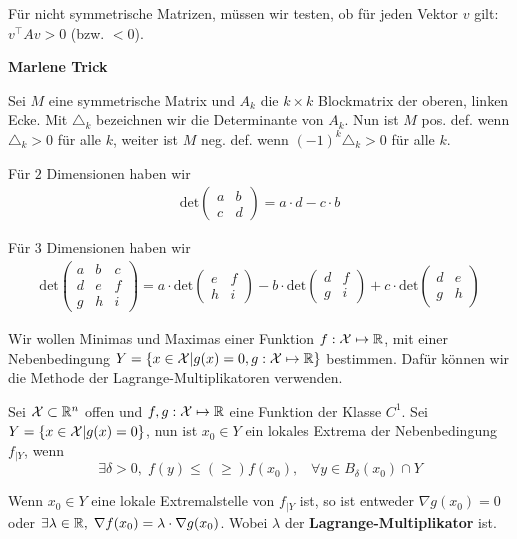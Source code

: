 Für nicht symmetrische Matrizen, müssen wir testen, ob für jeden Vektor $v$ gilt: $v^\top A v > 0$ (bzw. $<0$). \medskip

\textbf{Marlene Trick}

Sei $M$ eine symmetrische Matrix und $A_k$ die $k \times k$ Blockmatrix der oberen, linken
Ecke. Mit $\triangle_k$ bezeichnen wir die Determinante von $A_k$. Nun ist $M$ pos. def.
wenn $\triangle_k > 0$ für alle $k$, weiter ist $M$ neg. def. wenn $(-1)^k \triangle_k > 0$
für alle $k$.

Für $2$ Dimensionen haben wir
\begin{align*}
  \text{det}
  \begin{pmatrix}
    a & b\\
    c & d
  \end{pmatrix}
  = a \cdot d - c \cdot b 
\end{align*}


\vfill\null
\columnbreak


Für $3$ Dimensionen haben wir
\begin{align*}
  \text{det}
  \begin{pmatrix}
    a & b & c\\
    d & e & f\\
    g & h & i
  \end{pmatrix}
  = a \cdot \text{det}
  \begin{pmatrix}
    e & f\\
    h & i
  \end{pmatrix}
  - b \cdot \text{det}
  \begin{pmatrix}
    d & f\\
    g & i
  \end{pmatrix}
  + c \cdot \text{det}
  \begin{pmatrix}
    d & e\\
    g & h
  \end{pmatrix}
\end{align*}



Wir wollen Minimas und Maximas einer Funktion $f: \mathcal{X} \mapsto \mathbb{R}$, mit einer Nebenbedingung 
$Y = \{x \in \mathcal{X} | g(x) = 0, g:\mathcal{X} \mapsto \mathbb{R}\}$ bestimmen. Dafür können wir die Methode der
Lagrange-Multiplikatoren verwenden.

\begin{tcolorbox}
    Sei $\mathcal{X} \subset \mathbb{R}^n$ offen und $f,g : \mathcal{X} \mapsto \mathbb{R}$ eine Funktion der Klasse $C^1$. Sei 
    $Y = \{ x \in \mathcal{X} | g(x) = 0 \}$, nun ist $x_0 \in Y$ ein lokales Extrema der Nebenbedingung $f_{|Y}$, wenn
    $$\exists \delta > 0, \; f(y) \leq (\geq) f(x_0), \; \; \; \forall y \in B_\delta(x_0) \cap Y$$
\end{tcolorbox}

\begin{tcolorbox}
    Wenn $x_0 \in Y$ eine lokale Extremalstelle von $f_{|Y}$ ist, so ist entweder $\nabla g(x_0) = 0$ oder 
    $\exists \lambda \in \mathbb{R}, \; \nabla f(x_0) = \lambda \cdot \nabla g(x_0)$. Wobei $\lambda$ der
    \textbf{Lagrange-Multiplikator} ist.
\end{tcolorbox}